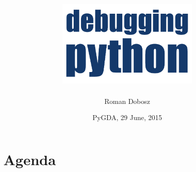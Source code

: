 \documentclass[14pt,notes,svgnames,aspectratio=1610]{beamer}
\begin{document}
\title{%
    \includegraphics[width=7cm]{images/title.pdf}
}
\author{Roman Dobosz}
\date{PyGDA, 29 June, 2015}

\begin{frame}
  \titlepage
\end{frame}

\begingroup
    \section{Agenda}
\endgroup
\end{document}
